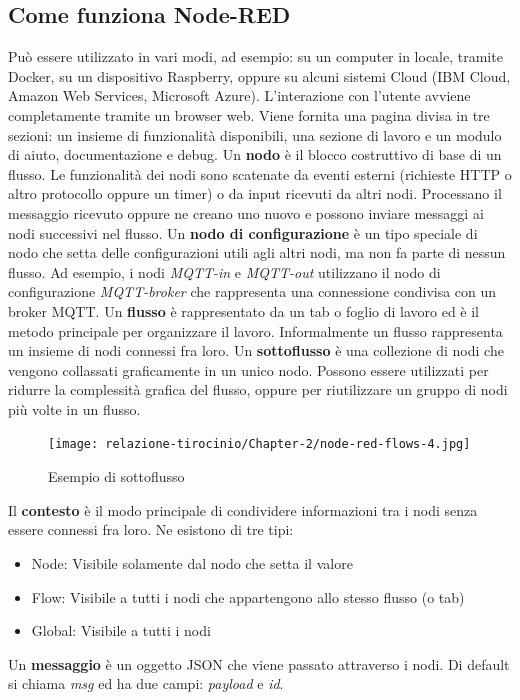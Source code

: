 \documentclass[a4paper,10pt]{memoir}
\begin{document}
\subsection{Come funziona Node-RED}
Può essere utilizzato in vari modi, ad esempio: su un computer in locale, tramite Docker, su un dispositivo Raspberry, oppure su alcuni sistemi Cloud (IBM Cloud, Amazon Web Services, Microsoft Azure).
L'interazione con l'utente avviene completamente tramite un browser web. Viene fornita una pagina divisa in tre sezioni: un insieme di funzionalità disponibili, una sezione di lavoro e un modulo di aiuto, documentazione e debug.
Un \textbf{nodo} è il blocco costruttivo di base di un flusso. Le funzionalità dei nodi sono scatenate da eventi esterni (richieste HTTP o altro protocollo oppure un timer) o da input ricevuti da altri nodi. Processano il messaggio ricevuto oppure ne creano uno nuovo e possono inviare messaggi ai nodi successivi nel flusso. 
Un \textbf{nodo di configurazione} è un tipo speciale di nodo che setta delle configurazioni utili agli altri nodi, ma non fa parte di nessun flusso. Ad esempio, i nodi \textit{MQTT-in} e \textit{MQTT-out} utilizzano il nodo di configurazione \textit{MQTT-broker} che rappresenta una connessione condivisa con un broker MQTT.
Un \textbf{flusso} è rappresentato da un tab o foglio di lavoro ed è il metodo principale per organizzare il lavoro. Informalmente un flusso rappresenta un insieme di nodi connessi fra loro.
Un \textbf{sottoflusso} è una collezione di nodi che vengono collassati graficamente in un unico nodo. Possono essere utilizzati per ridurre la complessità grafica del flusso, oppure per riutilizzare un gruppo di nodi più volte in un flusso.
\begin{figure}[H]
\caption{Esempio di sottoflusso}
\label{fig:sottoflusso}
\texttt{[image: relazione-tirocinio/Chapter-2/node-red-flows-4.jpg]}
\end{figure}
Il \textbf{contesto} è il modo principale di condividere informazioni tra i nodi senza essere connessi fra loro. Ne esistono di tre tipi:
\begin{itemize}
    \item Node: Visibile solamente dal nodo che setta il valore
    \item Flow: Visibile a tutti i nodi che appartengono allo stesso flusso (o tab)
    \item Global: Visibile a tutti i nodi
\end{itemize}
Un \textbf{messaggio} è un oggetto JSON che viene passato attraverso i nodi. Di default si chiama \textit{msg} ed ha due campi: \textit{payload} e \textit{id}. 
\end{document}
